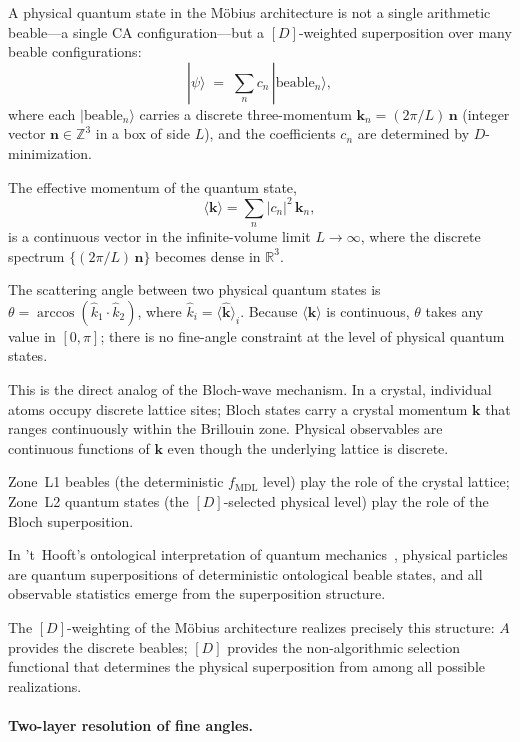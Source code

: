 \documentclass[12pt,letterpaper]{article}
\newcommand{\fmdl}{f_{\mathrm{MDL}}}
\newcommand{\Dclass}{[D]}
\begin{document}
A physical quantum state in the M\"{o}bius architecture is not a single arithmetic beable---a
single CA configuration---but a $\Dclass$-weighted superposition over many beable
configurations:
\begin{equation}
  |\psi\rangle \;=\; \sum_n c_n\,|\mathrm{beable}_n\rangle,
  \label{eq:beable-super}
\end{equation}
where each $|\mathrm{beable}_n\rangle$ carries a discrete three-momentum
$\mathbf{k}_n = (2\pi/L)\,\mathbf{n}$ (integer vector $\mathbf{n} \in \mathbb{Z}^3$
in a box of side $L$), and the coefficients $c_n$ are determined by $D$-minimization.

The effective momentum of the quantum state,
\[
  \langle\mathbf{k}\rangle = \sum_n |c_n|^2\,\mathbf{k}_n,
\]
is a continuous vector in the infinite-volume limit $L \to \infty$, where the discrete
spectrum $\{(2\pi/L)\,\mathbf{n}\}$ becomes dense in $\mathbb{R}^3$.

The scattering angle between two physical quantum states is
$\theta = \arccos(\hat{k}_1\cdot\hat{k}_2)$, where $\hat{k}_i = \langle\hat{\mathbf{k}}\rangle_i$.
Because $\langle\mathbf{k}\rangle$ is continuous, $\theta$ takes any value in $[0,\pi]$;
there is no fine-angle constraint at the level of physical quantum states.

This is the direct analog of the Bloch-wave mechanism.  In a crystal, individual
atoms occupy discrete lattice sites; Bloch states carry a crystal momentum
$\mathbf{k}$ that ranges continuously within the Brillouin zone.  Physical
observables are continuous functions of $\mathbf{k}$ even though the underlying
lattice is discrete.

Zone~L1 beables (the deterministic $\fmdl$ level) play the role of the crystal
lattice; Zone~L2 quantum states (the $\Dclass$-selected physical level) play the
role of the Bloch superposition.

In 't~Hooft's ontological interpretation of quantum mechanics~\cite{tHooft2016CA},
physical particles are quantum superpositions of deterministic ontological beable
states, and all observable statistics emerge from the superposition structure.

The $\Dclass$-weighting of the M\"{o}bius architecture realizes precisely this structure:
$A$ provides the discrete beables; $\Dclass$ provides the non-algorithmic selection
functional that determines the physical superposition from among all possible
realizations.

\paragraph{Two-layer resolution of fine angles.}
\end{document}
